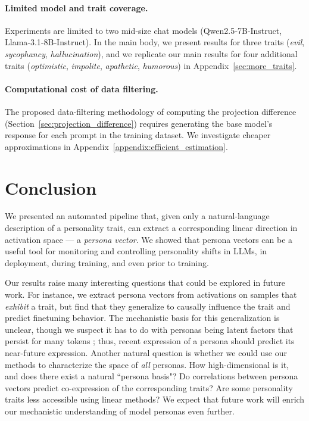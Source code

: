 \paragraph{Limited model and trait coverage.}  
Experiments are limited to two mid‑size chat models (Qwen2.5‑7B‑Instruct, Llama‑3.1‑8B‑Instruct).
In the main body, we present results for three traits (\textit{evil}, \textit{sycophancy}, \textit{hallucination}), and we replicate our main results for four additional traits (\textit{optimistic}, \textit{impolite}, \textit{apathetic}, \textit{humorous}) in Appendix~\ref{sec:more_traits}.
\paragraph{Computational cost of data filtering.}
The proposed data-filtering methodology of computing the projection difference (Section~\ref{sec:projection_difference}) requires generating the base model's response for each prompt in the training dataset. We investigate cheaper approximations in Appendix~\ref{appendix:efficient_estimation}.

\section{Conclusion}

We presented an automated pipeline that, given only a natural-language description of a personality trait, can extract a corresponding linear direction in activation space --- a \textit{persona vector}.
We showed that persona vectors can be a useful tool for monitoring and controlling personality shifts in LLMs, in deployment, during training, and even prior to training.

Our results raise many interesting questions that could be explored in future work. For instance, we extract persona vectors from activations on samples that \emph{exhibit} a trait, but find that they generalize to causally influence the trait and predict finetuning behavior. The mechanistic basis for this generalization is unclear, though we suspect it has to do with personas being latent factors that persist for many tokens \citep{wang2025personafeaturescontrolemergent}; thus, recent expression of a persona should predict its near-future expression. Another natural question is whether we could use our methods to characterize the space of \emph{all} personas. How high-dimensional is it, and does there exist a natural ``persona basis"? Do correlations between persona vectors predict co-expression of the corresponding traits? Are some personality traits less accessible using linear methods? We expect that future work will enrich our mechanistic understanding of model personas even further.
